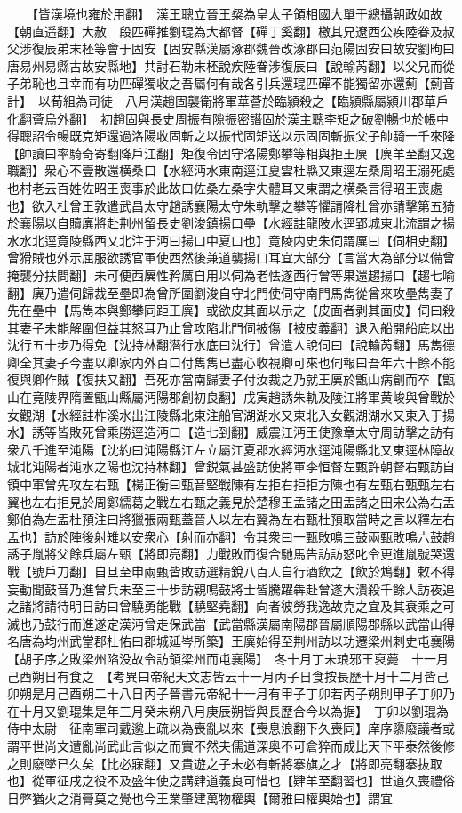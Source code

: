 　　【皆漢境也雍於用翻】　漢王聰立晉王粲為皇太子領相國大單于總攝朝政如故【朝直遥翻】大赦　段匹磾推劉琨為大都督【磾丁奚翻】檄其兄遼西公疾陸眷及叔父涉復辰弟末柸等會于固安【固安縣漢屬涿郡魏晉改涿郡曰范陽固安曰故安劉昫曰唐易州易縣古故安縣地】共討石勒末柸說疾陸眷涉復辰曰【說輸芮翻】以父兄而從子弟恥也且幸而有功匹磾獨收之吾屬何有哉各引兵還琨匹磾不能獨留亦還薊【薊音計】　以荀組為司徒　八月漢趙固襲衛將軍華薈於臨潁殺之【臨潁縣屬潁川郡華戶化翻薈烏外翻】　初趙固與長史周振有隙振密譖固於漢主聰李矩之破劉暢也於帳中得聰詔令暢既克矩還過洛陽收固斬之以振代固矩送以示固固斬振父子帥騎一千來降【帥讀曰率騎奇寄翻降戶江翻】矩復令固守洛陽鄭攀等相與拒王廙【廙羊至翻又逸職翻】衆心不壹散還横桑口【水經沔水東南逕江夏雲杜縣又東逕左桑周昭王溺死處也村老云百姓佐昭王喪事於此故曰佐桑左桑字失體耳又東謂之横桑言得昭王喪處也】欲入杜曾王敦遣武昌太守趙誘襄陽太守朱軌擊之攀等懼請降杜曾亦請擊第五猗於襄陽以自贖廙將赴荆州留長史劉浚鎮揚口壘【水經註龍陂水逕郢城東北流謂之揚水水北逕竟陵縣西又北注于沔曰揚口中夏口也】竟陵内史朱伺謂廙曰【伺相吏翻】曾猾賊也外示屈服欲誘官軍使西然後兼道襲揚口耳宜大部分【言當大為部分以備曾掩襲分扶問翻】未可便西廙性矜厲自用以伺為老怯遂西行曾等果還趨揚口【趨七喻翻】廙乃遣伺歸裁至壘即為曾所圍劉浚自守北門使伺守南門馬雋從曾來攻壘雋妻子先在壘中【馬雋本與鄭攀同距王廙】或欲皮其面以示之【皮面者剥其面皮】伺曰殺其妻子未能解圍但益其怒耳乃止曾攻陷北門伺被傷【被皮義翻】退入船開船底以出沈行五十步乃得免【沈持林翻潛行水底曰沈行】曾遣人說伺曰【說輸芮翻】馬雋德卿全其妻子今盡以卿家内外百口付雋雋已盡心收視卿可來也伺報曰吾年六十餘不能復與卿作賊【復扶又翻】吾死亦當南歸妻子付汝裁之乃就王廙於甑山病創而卒【甑山在竟陵界隋置甑山縣屬沔陽郡創初良翻】戊寅趙誘朱軌及陵江將軍黄峻與曾戰於女觀湖【水經註柞溪水出江陵縣北東注船官湖湖水又東北入女觀湖湖水又東入于揚水】誘等皆敗死曾乘勝逕造沔口【造七到翻】威震江沔王使豫章太守周訪擊之訪有衆八千進至沌陽【沈約曰沌陽縣江左立屬江夏郡水經沔水逕沌陽縣北又東逕林障故城北沌陽者沌水之陽也沈持林翻】曾鋭氣甚盛訪使將軍李恒督左甄許朝督右甄訪自領中軍曾先攻左右甄【楊正衡曰甄音堅戰陳有左拒右拒拒方陳也有左甄右甄甄左右翼也左右拒見於周鄭繻葛之戰左右甄之義見於楚穆王孟諸之田盂諸之田宋公為右盂鄭伯為左盂杜預注曰將獵張兩甄蓋晉人以左右翼為左右甄杜預取當時之言以釋左右盂也】訪於陣後射雉以安衆心【射而亦翻】令其衆曰一甄敗鳴三鼓兩甄敗鳴六鼓趙誘子胤將父餘兵屬左甄【將即亮翻】力戰敗而復合馳馬告訪訪怒叱令更進胤號哭還戰【號戶刀翻】自旦至申兩甄皆敗訪選精銳八百人自行酒飲之【飲於鴆翻】敕不得妄動聞鼓音乃進曾兵未至三十步訪親鳴鼓將士皆騰躍犇赴曾遂大潰殺千餘人訪夜追之諸將請待明日訪曰曾驍勇能戰【驍堅堯翻】向者彼勞我逸故克之宜及其衰乘之可滅也乃鼓行而進遂定漢沔曾走保武當【武當縣漢屬南陽郡晉屬順陽郡縣以武當山得名唐為均州武當郡杜佑曰郡城延岑所築】王廙始得至荆州訪以功遷梁州刺史屯襄陽【胡子序之敗梁州陷没故令訪領梁州而屯襄陽】　冬十月丁未琅邪王裒薨　十一月己酉朔日有食之　【考異曰帝紀天文志皆云十一月丙子日食按長歷十月十二月皆己卯朔是月己酉朔二十八日丙子晉書元帝紀十一月有甲子丁卯若丙子朔則甲子丁卯乃在十月又劉琨集是年三月癸未朔八月庚辰朔皆與長歷合今以為据】　丁卯以劉琨為侍中太尉　征南軍司戴邈上疏以為喪亂以來【喪息浪翻下久喪同】庠序隳廢議者或謂平世尚文遭亂尚武此言似之而實不然夫儒道深奥不可倉猝而成比天下平泰然後修之則廢墜已久矣【比必寐翻】又貴遊之子未必有斬將搴旗之才【將即亮翻搴抜取也】從軍征戌之役不及盛年使之講肄道義良可惜也【肄羊至翻習也】世道久喪禮俗日弊猶火之消膏莫之覺也今王業肇建萬物權輿【爾雅曰權輿始也】謂宜